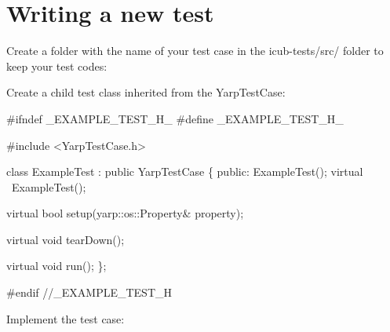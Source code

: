 \hypertarget{writing-and-running_writing-new-tests}{}\section{Writing a new test}\label{writing-and-running_writing-new-tests}
Create a folder with the name of your test case in the {\ttfamily icub-\/tests/src/} folder to keep your test codes\+:




Create a child test class inherited from the {\ttfamily Yarp\+Test\+Case}\+:


\begin{DoxyCode}
\textcolor{preprocessor}{#ifndef \_EXAMPLE\_TEST\_H\_}
\textcolor{preprocessor}{#define \_EXAMPLE\_TEST\_H\_}

\textcolor{preprocessor}{#include <YarpTestCase.h>}

\textcolor{keyword}{class }ExampleTest : \textcolor{keyword}{public} YarpTestCase \{
\textcolor{keyword}{public}:
    ExampleTest();
    \textcolor{keyword}{virtual} ~ExampleTest();

    \textcolor{keyword}{virtual} \textcolor{keywordtype}{bool} setup(yarp::os::Property& property);

    \textcolor{keyword}{virtual} \textcolor{keywordtype}{void} tearDown();

    \textcolor{keyword}{virtual} \textcolor{keywordtype}{void} run();
\};

\textcolor{preprocessor}{#endif //\_EXAMPLE\_TEST\_H}
\end{DoxyCode}


Implement the test case\+:


